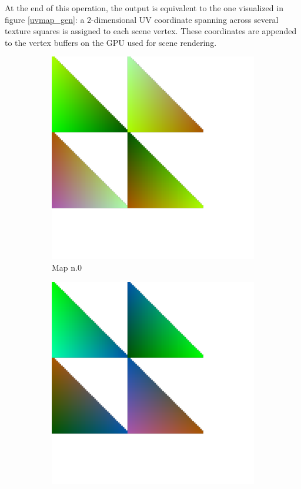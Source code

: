 At the end of this operation, the output is equivalent to the one visualized in figure \ref{uvmap_gen}: a 2-dimensional UV coordinate spanning across several texture squares is assigned to each scene vertex. These coordinates are appended to the vertex buffers on the GPU used for scene rendering.

\begin{figure}
	\centering
	\begin{subfigure}[t]{0.24\linewidth}
		\includegraphics[width=\textwidth]{chapters/chapter_thetool/uvworld0}
		\caption{Map n.0}
	\end{subfigure}
	\begin{subfigure}[t]{0.24\linewidth}
		\includegraphics[width=\textwidth]{chapters/chapter_thetool/uvworld1}

\end{subfigure}
\end{figure}
